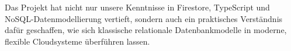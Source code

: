 \documentclass[12pt,a4paper%
              ,oneside     %
              ,titlepage
              ,DIV=13
              ,headinclude
              ,footinclude=false%
              ,cleardoublepage=empty%
              ,parskip=half,
              BCOR=0mm,
              ]{scrreprt}
\begin{document}
Das Projekt hat nicht nur unsere Kenntnisse in Firestore, TypeScript und NoSQL-Datenmodellierung vertieft, sondern auch ein praktisches Verständnis dafür geschaffen, wie sich klassische relationale Datenbankmodelle in moderne, flexible Cloudsysteme überführen lassen.


\appendix




\renewcommand{\bibfont}{\footnotesize}
\printbibliography[title={Literaturverzeichnis}, 
                   heading=bibintoc]


{ %
\printindex
}
\end{document}
